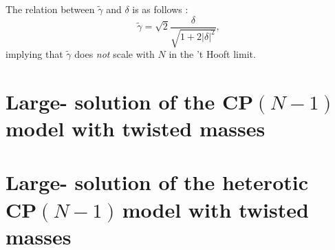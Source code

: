 \documentclass[epsfig,12pt]{article}
\def\beq{\begin{equation}}
\def\eeq{\end{equation}}
\newcommand{\cpn}{CP$(N-1)\,$}
\def\beq{\begin{equation}}
\def\eeq{\end{equation}}
\begin{document}
The relation between $\tilde\gamma$ and $\delta$
is as follows \cite{BSY3}:
\beq
\tilde\gamma = \sqrt{2} \frac{\delta}{\sqrt{1+ 2 |\delta |^2}},
\eeq
{}
implying that $\tilde \gamma$ does {\em not} scale with $N$ in the 't Hooft limit.


\section{Large- solution
of the \cpn model with twisted masses}

\section{Large- solution
of the  heterotic\\ \cpn model with twisted masses}
\end{document}
